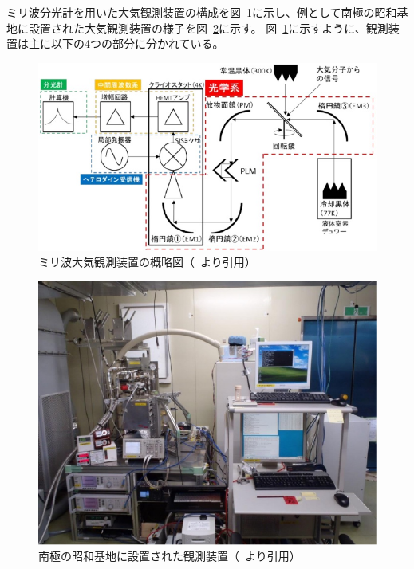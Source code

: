 ミリ波分光計を用いた大気観測装置の構成を図~\ref{fig:mm_component}に示し、例として南極の昭和基地に設置された大気観測装置の様子を図~\ref{fig:mmobs_spectrometer_syowa}に示す。
図~\ref{fig:mm_component}に示すように、観測装置は主に以下の4つの部分に分かれている。
\begin{figure}[htbp]
    \centering
    \includegraphics[width=\linewidth]{master_thesis_contents/master_thesis_fig/mm_component.pdf}
    \caption{ミリ波大気観測装置の概略図（~\cite{ito2017master}より引用）}
    \label{fig:mm_component}
\end{figure}
\begin{figure}[htbp]
    \centering
    \includegraphics[width=\linewidth]{master_thesis_contents/master_thesis_fig/mmobs_spectrometer_syowa.pdf}
    \caption{南極の昭和基地に設置された観測装置（~\cite{uemura2014master}より引用）}
    \label{fig:mmobs_spectrometer_syowa}
\end{figure}
